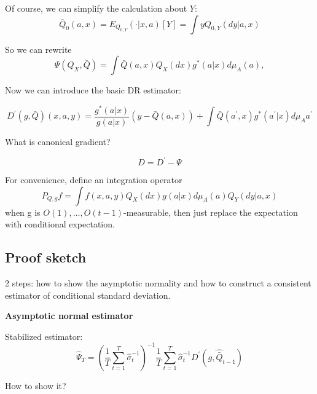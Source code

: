 \documentclass{article}
\newcommand{\smalltitle}[1]{\noindent \textbf{#1}}
\begin{document}
Of course, we can simplify the calculation about $Y$:
\begin{equation}
    \bar{Q}_0(a,x)=E_{Q_{0,Y}}(\cdot|x,a)[Y] = \int y Q_{0,Y}(dy|a,x)
\end{equation}

So we can rewrite 
\begin{equation}
    \Psi(Q_X,\bar{Q})=\int \bar{Q}(a,x) Q_X(dx) g^*(a|x) d\mu_A(a),
\end{equation}

Now we can introduce the basic DR estimator:

\begin{equation}
    D^\prime(g,\bar{Q})(x,a,y)= \frac{g^*(a|x)}{g(a|x)}(y-\bar{Q}(a,x))+ \int \bar{Q}(a^\prime,x)g^*(a^\prime|x) d\mu_A a^\prime
\end{equation}

What is canonical gradient?

\begin{equation}
    D = D^\prime - \Psi    
\end{equation}

For convenience, define an integration operator
\begin{equation}
    P_{Q,g} f = \int f(x,a,y) Q_X(dx) g(a|x) d\mu_A(a) Q_Y(dy|a,x)
\end{equation}
when g is $O(1),\dots, O(t-1)$-measurable, then just replace the expectation with conditional expectation.


\subsection{Proof sketch}
2 steps: how to show the asymptotic normality and how to construct a consistent estimator of conditional standard deviation.


\smalltitle{Asymptotic normal estimator}

Stabilized estimator:
\begin{equation}
    \hat{\Psi}_T = (\frac{1}{T}\sum^T_{t=1}\hat{\sigma}_t^{-1})^{-1} \frac{1}{T} \sum_{t=1}^T\hat{\sigma}_t^{-1}D^\prime(g,\hat{\bar{Q}}_{t-1})
\end{equation}

How to show it?
\end{document}
